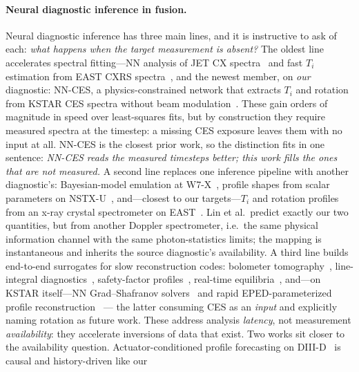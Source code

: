 \documentclass[10pt]{article}
\newcommand{\Ti}{\ensuremath{T_i}}
\begin{document}
\paragraph{Neural diagnostic inference in fusion.}
Neural diagnostic inference has three main lines, and it is instructive to ask
of each: \emph{what happens when the target measurement is absent?} The oldest
line accelerates spectral fitting---NN analysis of JET CX
spectra~\citep{Bishop1993AutomaticAnalysis,Svensson1999AnalysisJet} and fast
\Ti{} estimation from EAST CXRS spectra~\citep{Chai2019FastEstimation}, and the
newest member, on \emph{our} diagnostic: NN-CES, a physics-constrained network
that extracts \Ti{} and rotation from KSTAR CES spectra without beam
modulation~\citep{Lee2026NeuralNetworkbased}. These gain orders of magnitude in
speed over least-squares fits, but by construction they require measured spectra
at the timestep: a missing CES exposure leaves them with no input at all. NN-CES
is the closest prior work, so the distinction fits in one sentence: \emph{NN-CES
reads the measured timesteps better; this work fills the ones that are not
measured.} A second line replaces one inference pipeline with
another diagnostic's: Bayesian-model emulation at
W7-X~\citep{Pavone2019NeuralNetwork}, profile shapes from scalar parameters on
NSTX-U~\citep{Boyer2021PredictionElectron}, and---closest to our targets---\Ti{}
and rotation profiles from an x-ray crystal spectrometer on
EAST~\citep{Lin2024PredictionPlasma}. Lin et al.\ predict exactly our two
quantities, but from another Doppler spectrometer, i.e.\ the same physical
information channel with the same photon-statistics limits; the mapping is
instantaneous and inherits the source diagnostic's availability. A third line
builds end-to-end surrogates for slow reconstruction codes: bolometer
tomography~\citep{Matos2016DeepLearning}, line-integral
diagnostics~\citep{Wang2025PhysicsinformedDeep}, safety-factor
profiles~\citep{Wei2023ReconstructionTokamak}, real-time
equilibria~\citep{Zheng2024RealtimeEquilibrium}, and---on KSTAR itself---NN
Grad--Shafranov solvers~\citep{Joung2020DeepNeural,Joung2023GsdeepnetMastering}
and rapid EPED-parameterized profile
reconstruction~\citep{Jung2026MachineLearningbased} --- the latter consuming CES
as an \emph{input} and explicitly naming rotation as future work. These address analysis
\emph{latency}, not measurement \emph{availability}: they accelerate inversions
of data that exist. Two works sit closer to the availability question.
Actuator-conditioned profile forecasting on
DIII-D~\citep{Abbate2021DatadrivenProfile} is causal and history-driven like our
\end{document}
